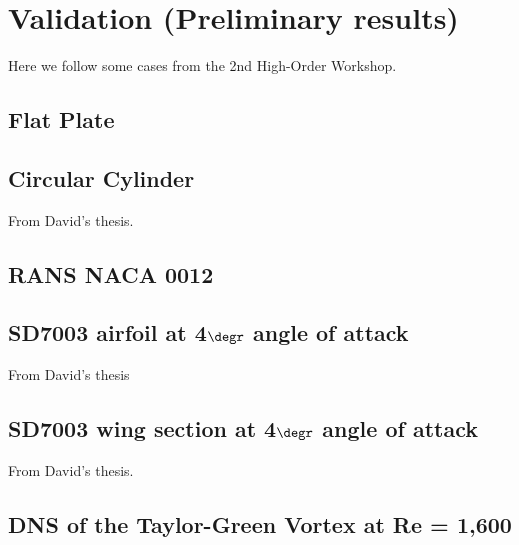 \section{Validation (Preliminary results)}
\label{sec:validation}
Here we follow some cases from the 2nd High-Order Workshop.

\subsection{Flat Plate}

\subsection{Circular Cylinder}
From David's thesis.




\subsection{RANS NACA 0012}

\subsection{SD7003 airfoil at 4$\degr$ angle of attack}
From David's thesis\cite{williams2013thesis}
\subsection{SD7003 wing section at 4$\degr$ angle of attack}
From David's thesis.

\subsection{DNS of the Taylor-Green Vortex at Re = 1,600}

